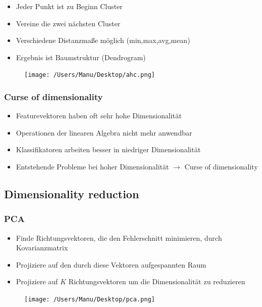 \documentclass[paper=a4, fontsize=11pt]{scrartcl} %
\numberwithin{equation}{section} %
\numberwithin{figure}{section} %
\numberwithin{table}{section} %
\begin{document}
\begin{minipage}{0.5\textwidth}
\begin{itemize}
\item Jeder Punkt ist zu Beginn Cluster
\item Vereine die zwei nächsten Cluster
\item Verschiedene Distanzmaße möglich (min,max,avg,mean)
\item Ergebnis ist Baumstruktur (Dendrogram)
\end{itemize}
\end{minipage} \hfill
\begin{minipage}{0.45\textwidth}
\begin{figure}[H]
\texttt{[image: /Users/Manu/Desktop/ahc.png]}
\end{figure}
\end{minipage}

\subsubsection{\glqq Curse of dimensionality\grqq}

\begin{itemize}
\item Featurevektoren haben oft sehr hohe Dimensionalität
\item Operationen der linearen Algebra nicht mehr anwendbar
\item Klassifikatoren arbeiten besser in niedriger Dimensionalität
\item Entstehende Probleme bei hoher Dimensionalität $\rightarrow$ \glqq Curse of dimensionality\grqq
\end{itemize}

\subsection{Dimensionality reduction}

\subsubsection{PCA}

\begin{minipage}{0.6\textwidth}
\begin{itemize}
\item Finde Richtungsvektoren, die den Fehlerschnitt minimieren, durch Kovarianzmatrix
\item Projiziere auf den durch diese Vektoren aufgespannten Raum
\item Projiziere auf $K$ Richtungsvektoren um die Dimensionalität zu reduzieren
\end{itemize}
\end{minipage} \hfill
\begin{minipage}{0.35\textwidth}
\begin{figure}[H]
\texttt{[image: /Users/Manu/Desktop/pca.png]}
\end{figure}
\end{minipage}
\end{document}
